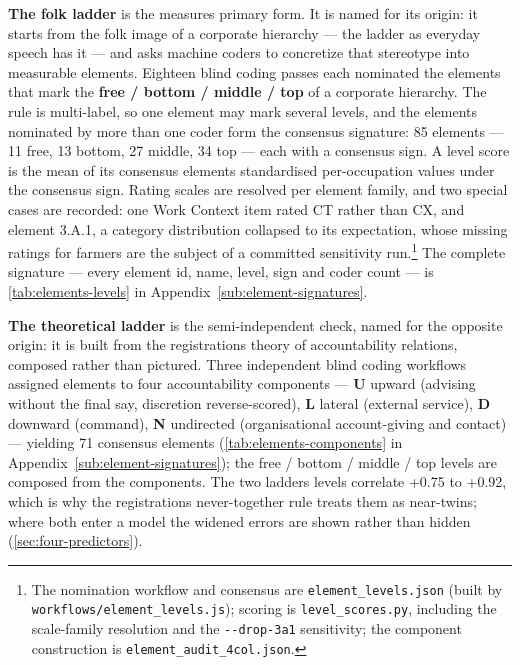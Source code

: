 \textbf{The folk ladder} is the measure\textquotesingle s primary form. It is named for its origin:
it starts from the folk image of a corporate hierarchy --- the ladder as
everyday speech has it --- and asks machine coders to concretize that stereotype
into measurable elements. Eighteen blind coding passes each nominated the
elements that mark the \textbf{free / bottom / middle / top} of a corporate
hierarchy. The rule is multi-label, so one element may mark several levels,
and the elements nominated by more than one coder form the consensus
signature: 85 elements --- 11 free, 13 bottom, 27 middle, 34 top --- each with a
consensus sign. A level score is the mean of its consensus elements\textquotesingle{}
standardised per-occupation values under the consensus sign. Rating scales are
resolved per element family, and two special cases are recorded: one Work
Context item rated CT rather than CX, and element 3.A.1, a category
distribution collapsed to its expectation, whose missing ratings for farmers
are the subject of a committed sensitivity run.\footnote{The nomination workflow and consensus are \texttt{element\_levels.json}
  (built by \texttt{workflows/\allowbreak{}element\_\allowbreak{}levels.\allowbreak{}js}); scoring is
  \texttt{level\_scores.py}, including the scale-family resolution and the
  \texttt{-\/-drop-3a1} sensitivity; the component construction is
  \texttt{element\_\allowbreak{}audit\_\allowbreak{}4col.\allowbreak{}json}.} The complete signature
--- every element id, name, level, sign and coder count --- is \cref{tab:elements-levels} in Appendix~\ref{sub:element-signatures}.

\textbf{The theoretical ladder} is the semi-independent check, named for the
opposite origin: it is built from the registration\textquotesingle s theory of
accountability relations, composed rather than pictured. Three independent
blind coding workflows assigned elements to four accountability components --- \textbf{U} upward (advising without the final say, discretion
reverse-scored), \textbf{L} lateral (external service), \textbf{D} downward
(command), \textbf{N} undirected (organisational account-giving and contact) ---
yielding 71 consensus elements (\cref{tab:elements-components} in Appendix~\ref{sub:element-signatures}); the free /
bottom / middle / top levels are composed from the components. The two
ladders\textquotesingle{} levels correlate +0.75 to +0.92, which is why the registration\textquotesingle s
never-together rule treats them as near-twins; where both enter a model the
widened errors are shown rather than hidden (\cref{sec:four-predictors}).

